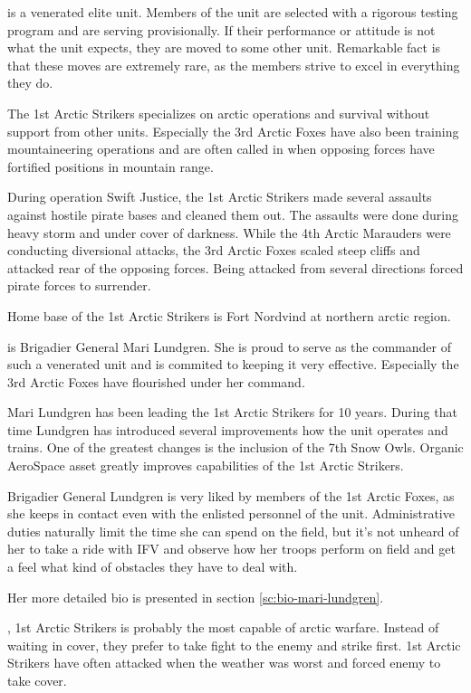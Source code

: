 \documentclass{tufte-book}
\begin{document}
 is a venerated elite unit. Members of the unit
are selected with a rigorous testing program and are serving provisionally.
If their performance or attitude is not what the unit expects, they are moved
to some other unit. Remarkable fact is that these moves are extremely rare,
as the members strive to excel in everything they do.

The 1st Arctic Strikers specializes on arctic operations and survival without
support from other units. Especially the 3rd Arctic Foxes have also been
training mountaineering operations and are often called in when opposing
forces have fortified positions in mountain range.

During operation Swift Justice, the 1st Arctic Strikers made several assaults
against hostile pirate bases and cleaned them out. The assaults were done
during heavy storm and under cover of darkness. While the 4th Arctic Marauders
were conducting diversional attacks, the 3rd Arctic Foxes scaled steep cliffs
and attacked rear of the opposing forces. Being attacked from several
directions forced pirate forces to surrender.

Home base of the 1st Arctic Strikers is Fort Nordvind at northern arctic
region.

 is Brigadier General Mari
Lundgren. She is proud to serve as the commander of such a venerated unit and
is commited to keeping it very effective. Especially the 3rd Arctic
Foxes have flourished under her command.

Mari Lundgren has been leading the 1st Arctic Strikers for 10 years. During
that time Lundgren has introduced several improvements how the unit operates
and trains. One of the greatest changes is the inclusion of the 7th Snow Owls.
Organic AeroSpace asset greatly improves capabilities of the 1st Arctic
Strikers.

Brigadier General Lundgren is very liked by members of the 1st Arctic Foxes,
as she keeps in contact even with the enlisted personnel of the unit.
Administrative duties naturally limit the time she can spend on the field,
but it's not unheard of her to take a ride with IFV and observe how her troops
perform on field and get a feel what kind of obstacles they have to deal with.

Her more detailed bio is presented in section \ref{sc:bio-mari-lundgren}.

, 1st Arctic Strikers is probably the
most capable of arctic warfare. Instead of waiting in cover, they prefer to
take fight to the enemy and strike first. 1st Arctic Strikers have often
attacked when the weather was worst and forced enemy to take cover.
\end{document}
